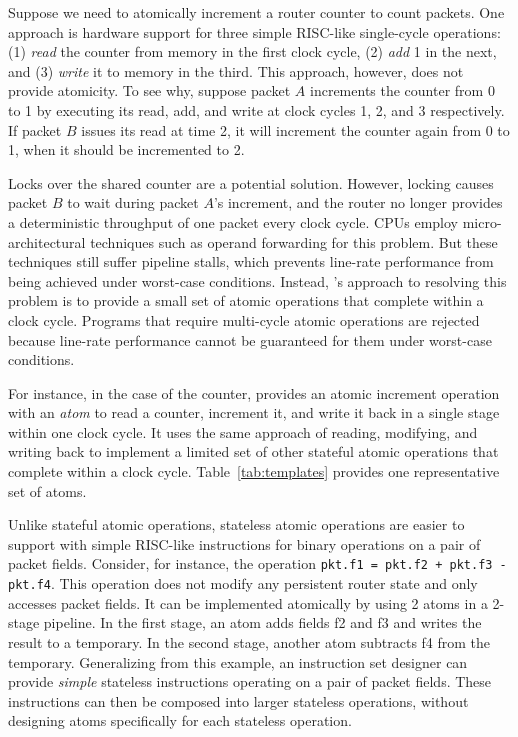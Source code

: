 Suppose we need to atomically increment a router counter to count packets. One
approach is hardware support for three simple RISC-like single-cycle
operations: (1) \textit{read} the counter from memory in the first clock cycle,
(2) \textit{add} 1 in the next, and (3) \textit{write} it to memory in the
third.  This approach, however, does not provide atomicity. To see why, suppose
packet $A$ increments the counter from 0 to 1 by executing its read, add, and
write at clock cycles 1, 2, and 3 respectively.  If packet $B$ issues its read
at time 2, it will increment the counter again from 0 to 1, when it should be
incremented to 2.

Locks over the shared counter are a potential solution.  However, locking
causes packet $B$ to wait during packet $A$'s increment, and the router no
longer provides a deterministic throughput of one packet every clock cycle. CPUs employ
micro-architectural techniques such as operand forwarding for this problem. But
these techniques still suffer pipeline stalls, which prevents line-rate
performance from being achieved under worst-case conditions. Instead,
\absmachine's approach to resolving this problem is to provide a small set of
atomic operations that complete within a clock cycle. Programs that require
multi-cycle atomic operations are rejected because line-rate performance cannot
be guaranteed for them under worst-case conditions.

For instance, in the case of the counter, \absmachine provides an atomic
increment operation with an {\em atom} to read a counter, increment it, and
write it back in a single stage within one clock cycle. It uses the same
approach of reading, modifying, and writing back to implement a limited set of
other stateful atomic operations that complete within a clock cycle.
Table~\ref{tab:templates} provides one representative set of atoms.

Unlike stateful atomic operations, stateless atomic operations are easier to
support with simple RISC-like instructions for binary operations on a pair of packet
fields.  Consider, for instance, the operation {\tt pkt.f1 = pkt.f2 + pkt.f3 -
pkt.f4}.  This operation does not modify any persistent router state and only
accesses packet fields. It can be implemented atomically by using 2 atoms in a
2-stage pipeline. In the first stage, an atom adds fields f2 and f3 and writes
the result to a temporary. In the second stage, another atom subtracts f4 from
the temporary. Generalizing from this example, an instruction set designer can
provide {\em simple} stateless instructions operating on a pair of packet
fields. These instructions can then be composed into larger stateless
operations, without designing atoms specifically for each stateless operation.

